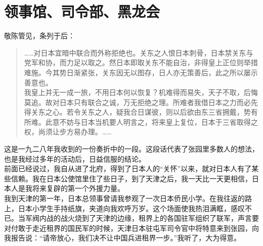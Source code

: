 \fancyhead[RO]{\thepage} %
\fancyhead[LE]{\thepage} %
\chapter*{领事馆、司令部、黑龙会}
敬陈管见，条列于后：\\

\begin{quote}
	……对日本宜暗中联合而外称拒绝也。关东之人恨日本刺骨，日本禁关东与党军和协，而力足以取之。然日本即取关东不能自治，非得皇上正位则举措难施。今其势日渐紧张，关东因无以图存，日人亦无策善后，此之所以屡示善意也。\\

我皇上并无一成一旅，不用日本何以恢复？机难得而易失，天子不取，后悔莫追。故对日本只有联合之诚，万无拒绝之理。所难者我借日本之力而必先得关东之心。若令关东之人，疑我合日谋彼，则以后欲由东三省拥戴，势有所难。此意不妨与日本当机要人明言之，将来皇上复位，日本于三省取得之权，尚须让步方易办理。……\\
\end{quote}

这是一九二八年我收到的一份奏折中的一段。这段话代表了张园里多数人的想法，也是我经过多年的活动后，日益信服的结论。\\

前面已经说过，我自从进了北府，得到了日本人的“关怀”以来，就对日本人有了某些信赖。我在日本公使馆里住了些日子，到了天津之后，我一天比一天更相信，日本人是我将来复辟的第一个外援力量。\\

我到天津的第一年，日本总领事曾请我参观了一次日本侨民小学。在我往返的路上，日本小学生手持纸旗，夹道向我欢呼万岁。这个场面使我热泪满眶，感叹不已。当军阀内战的战火烧到了天津的边缘，租界上的各国驻军组织了联军，声言要对付敢于走近租界的国民军的时候，天津日本驻屯军司令官中将特意来到张园，向我报告说：“请帝放心，我们决不让中国兵进租界一步。”我听了，大为得意。\\

